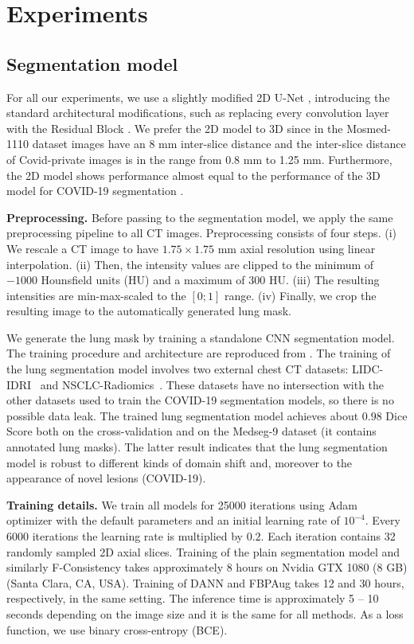 \section{Experiments}

\subsection{Segmentation model}

For all our experiments, we use a  slightly modified 2D U-Net \cite{unet}, introducing the standard architectural modifications, such as replacing every convolution layer with the Residual Block \cite{he2016deep}. We prefer the 2D model to 3D since in the Mosmed-1110 dataset images have an 8 mm inter-slice distance and the inter-slice distance of Covid-private images is in the range from 0.8 mm to 1.25 mm. Furthermore, the 2D model shows performance almost equal to the performance of the 3D model for COVID-19 segmentation \cite{goncharov2021ct}.%

\textbf{Preprocessing.} Before passing to the segmentation model, we apply the same preprocessing pipeline to all CT images. Preprocessing consists of four steps. (i) We rescale a CT image to have $1.75 \times 1.75$ mm axial resolution {using linear interpolation}. (ii) Then, the intensity values are clipped to the minimum of $-1000$ Hounsfield units (HU) and a maximum of $300$ HU. (iii) The resulting intensities are min-max-scaled to the $[0; 1]$ range. (iv) Finally, we crop the resulting image to the automatically generated lung mask.

We generate the lung mask by training a standalone CNN segmentation model. The training procedure and architecture are reproduced from \cite{goncharov2021ct}. The training of the lung segmentation model involves two external chest CT datasets: LIDC-IDRI~\cite{lidc} and NSCLC-Radiomics~\cite{nsclc1,nsclc2}. These datasets have no intersection with the other datasets used to train the COVID-19 segmentation models, so there is no possible data leak. The trained lung segmentation model achieves about $0.98$ Dice Score both on the cross-validation and on the Medseg-9 dataset (it contains annotated lung masks). The latter result indicates that the lung segmentation model is robust to different kinds of domain shift and, moreover to the appearance of novel lesions (COVID-19).

\textbf{Training details.} We train all models for 25000 iterations using Adam~\cite{kingma2014adam} optimizer with the default parameters and an initial learning rate of $10^{-4}$. Every 6000 iterations the learning rate is multiplied by $0.2$. Each iteration contains 32 randomly sampled 2D axial slices. Training of the plain segmentation model and similarly F-Consistency takes approximately 8 hours on Nvidia GTX 1080 (8 GB) (Santa Clara, CA, USA). Training of DANN and FBPAug takes 12 and 30 hours, respectively, in the same setting. The inference time is approximately 5 -- 10 seconds depending on the image size and it is the same for all methods. As a loss function, we use binary cross-entropy (BCE).

